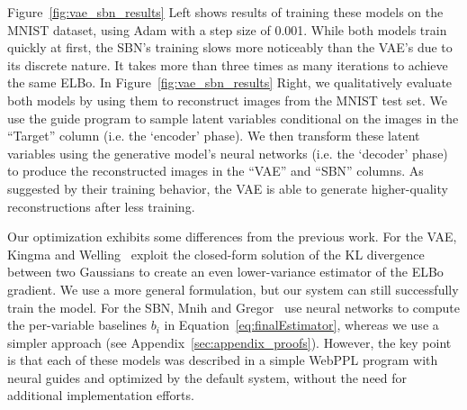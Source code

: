 Figure~\ref{fig:vae_sbn_results} Left shows results of training these models on the MNIST dataset, using Adam with a step size of 0.001.
While both models train quickly at first, the SBN's training slows more noticeably than the VAE's due to its discrete nature. It takes more than three times as many iterations to achieve the same ELBo.
In Figure~\ref{fig:vae_sbn_results} Right, we qualitatively evaluate both models by using them to reconstruct images from the MNIST test set. We use the guide program to sample latent variables conditional on the images in the ``Target'' column (i.e. the `encoder' phase). We then transform these latent variables using the generative model's neural networks (i.e. the `decoder' phase) to produce the reconstructed images in the ``VAE'' and ``SBN'' columns.
As suggested by their training behavior, the VAE is able to generate higher-quality reconstructions after less training.

Our optimization exhibits some differences from the previous work.
For the VAE, Kingma and Welling~\cite{AEVB} exploit the closed-form solution of the KL divergence between two Gaussians to create an even lower-variance estimator of the ELBo gradient. We use a more general formulation, but our system can still successfully train the model.
For the SBN, Mnih and Gregor~\cite{NVIL} use neural networks to compute the per-variable baselines $b_i$ in Equation~\ref{eq:finalEstimator}, whereas we use a simpler approach (see Appendix~\ref{sec:appendix_proofs}).
However, the key point is that each of these models was described in a simple WebPPL program with neural guides and optimized by the default system, without the need for additional implementation efforts.

